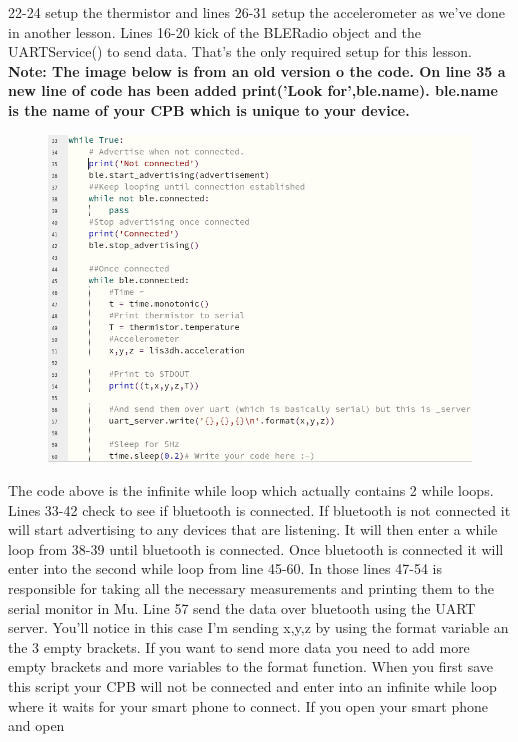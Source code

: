 22-24 setup the thermistor and lines 26-31 setup the accelerometer as
we've done in another lesson. Lines 16-20 kick of the BLERadio object
and the UARTService() to send data. That's the only required setup for
this lesson. {\bf Note: The image below is from an old version o the
code. On line 35 a new line of code has been added print('Look
for',ble.name). ble.name is the name of your CPB which is unique to
your device.} 
\begin{figure}[H]
  \begin{center}
    \includegraphics[width=\textwidth]{Figures/bluetooth_code1.png}
  \end{center}
\end{figure}
The code above is the infinite while loop which actually contains 2
while loops. Lines 33-42 check to see if bluetooth is connected. If
bluetooth is not connected it will start advertising to any devices
that are listening. It will then enter a while loop from 38-39 until
bluetooth is connected. Once bluetooth is connected it will enter into
the second while loop from line 45-60. In those lines 47-54 is
responsible for taking all the necessary measurements and printing
them to the serial monitor in Mu. Line 57 send the data over bluetooth
using the UART server. You'll notice in this case I'm sending x,y,z by
using the format variable an the 3 empty {} brackets. If you want to
send more data you need to add more empty brackets and more variables
to the format function. When you first save this script your CPB will
not be connected and enter into an infinite while loop where it waits
for your smart phone to connect. If you open your smart phone and open
